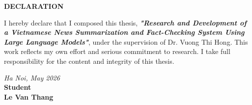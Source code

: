 

\begin{center}
  \textbf{\large{DECLARATION}}
\end{center}

I hereby declare that I composed this thesis, 
\textbf{\textit{"Research and Development of a Vietnamese News Summarization and Fact-Checking System Using Large Language Models"}},
under the supervision of Dr. Vuong Thi Hong. 
This work reflects my own effort and serious commitment to research.
I take full responsibility for the content and integrity of this thesis.

\vspace{1cm}
\begin{flushright}
  \begin{minipage}{8cm}
    \centering
    \textit{Ha Noi, May 2026}\\[0.2cm]
    \textbf{Student}\\[2.5cm]

    \textbf{Le Van Thang}
  \end{minipage}
\end{flushright}